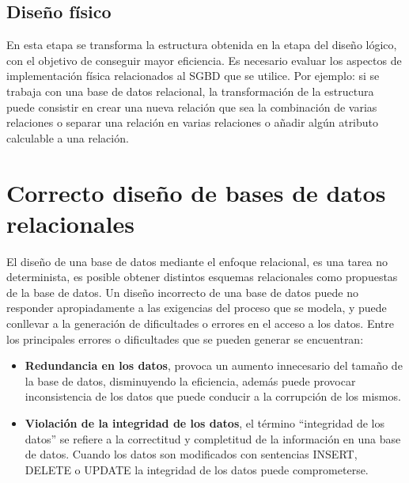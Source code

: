
\subsection{Diseño físico}
En esta etapa se transforma la estructura obtenida en la etapa del diseño
lógico, con el objetivo de conseguir mayor eficiencia. Es necesario
evaluar los aspectos de implementación física relacionados al SGBD que se utilice.
Por ejemplo: si se trabaja con una base de datos relacional, la 
transformación de la estructura puede consistir en crear una nueva relación que 
sea la combinación de varias relaciones o separar una relación en varias relaciones o 
añadir algún atributo calculable a una relación. \\





\section{Correcto diseño de bases de datos relacionales}

El diseño de una base de datos mediante el enfoque relacional, es una 
tarea no determinista, es posible obtener distintos esquemas relacionales 
como propuestas de la base de datos.
Un diseño incorrecto de una base de datos puede no responder apropiadamente a las exigencias
del proceso que se modela, y puede conllevar a la generación de dificultades o 
errores en el acceso a los datos. Entre los principales errores o dificultades que se pueden generar
se encuentran:

\begin{itemize}
    \item \textbf{Redundancia en los datos}, provoca un aumento innecesario 
    del tamaño de la base de datos, disminuyendo la eficiencia, además puede provocar 
    inconsistencia de los datos que puede conducir a la corrupción de los mismos. 
    \item \textbf{Violación de la integridad de los datos}, el término ``integridad de los datos'' se 
    refiere a la correctitud y completitud de la información en una base de datos. Cuando los datos son 
    modificados con sentencias INSERT, DELETE o UPDATE la integridad de los datos puede comprometerse.
\end{itemize}

